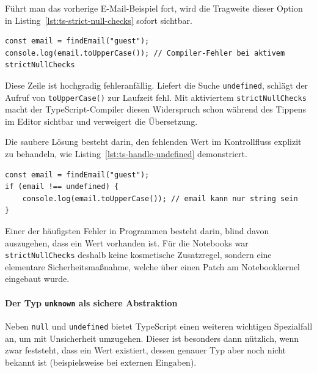 Führt man das vorherige E-Mail-Beispiel fort, wird die Tragweite dieser Option in Listing~\ref{lst:ts-strict-null-checks} sofort sichtbar.

\begin{listing}[htbp]
    \caption{Fehlerhafte Nutzung ohne vorherige Prüfung}
    \label{lst:ts-strict-null-checks}
    \begin{verbatim}
const email = findEmail("guest");
console.log(email.toUpperCase()); // Compiler-Fehler bei aktivem strictNullChecks
    \end{verbatim}
\end{listing}

Diese Zeile ist hochgradig fehleranfällig. Liefert die Suche \texttt{undefined}, schlägt der Aufruf von \texttt{toUpperCase()} zur Laufzeit fehl. Mit aktiviertem \texttt{strictNullChecks} macht der TypeScript-Compiler diesen Widerspruch schon während des Tippens im Editor sichtbar und verweigert die Übersetzung.

Die saubere Lösung besteht darin, den fehlenden Wert im Kontrollfluss explizit zu behandeln, wie Listing~\ref{lst:ts-handle-undefined} demonstriert.

\begin{listing}[htbp]
    \caption{Explizite Behandlung eines möglichen \texttt{undefined}-Werts}
    \label{lst:ts-handle-undefined}
    \begin{verbatim}
const email = findEmail("guest");
if (email !== undefined) {
    console.log(email.toUpperCase()); // email kann nur string sein
}
    \end{verbatim}
\end{listing}

Einer der häufigsten Fehler in Programmen besteht darin, blind davon auszugehen, dass ein Wert vorhanden ist. Für die Notebooks war \texttt{strictNullChecks} deshalb keine kosmetische Zusatzregel, sondern eine elementare Sicherheitsmaßnahme, welche über einen Patch am Notebookkernel eingebaut wurde. 

\paragraph{Der Typ \texttt{unknown} als sichere Abstraktion}
\label{par:unknown}

Neben \texttt{null} und \texttt{undefined} bietet TypeScript einen weiteren wichtigen Spezialfall an, um mit Unsicherheit umzugehen. Dieser ist besonders dann nützlich, wenn zwar feststeht, dass ein Wert existiert, dessen genauer Typ aber noch nicht bekannt ist (beispielsweise bei externen Eingaben).

